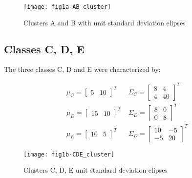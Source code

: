 \begin{figure}[ht]
\centering
	\texttt{[image: fig1a-AB\_cluster]}
	\label{fig:clustersDataAB}
	\caption{Clusters A and B with unit standard deviation elipses}
\end{figure}

 \subsection{Classes C, D, E}
 The three classes C, D and E were characterized by:
 
 \begin{eqnarray}
{\mu}_{C}=\left[ \begin{smallmatrix} 5&10 \end{smallmatrix}\right]^{T} \; & {\Sigma}_{C}=\left[ \begin{smallmatrix} 8&4 \\ 4&40 \end{smallmatrix}\right]^{T} \nonumber\\
{\mu}_{D}=\left[ \begin{smallmatrix} 15&10 \end{smallmatrix}\right]^{T} \; & {\Sigma}_{D}=\left[ \begin{smallmatrix} 8&0 \\ 0&8 \end{smallmatrix}\right]^{T} \nonumber\\
{\mu}_{E}=\left[ \begin{smallmatrix} 10&5 \end{smallmatrix}\right]^{T} \; & {\Sigma}_{D}=\left[ \begin{smallmatrix} 10&-5 \\ -5&20 \end{smallmatrix}\right]^{T} \nonumber
\end{eqnarray}
 
 
\begin{figure}[ht]
\centering
	\texttt{[image: fig1b-CDE\_cluster]}
	\label{fig:clustersDataCDE}
	\caption{Clusters C, D, E unit standard deviation elipses}
\end{figure}
 
\clearpage
